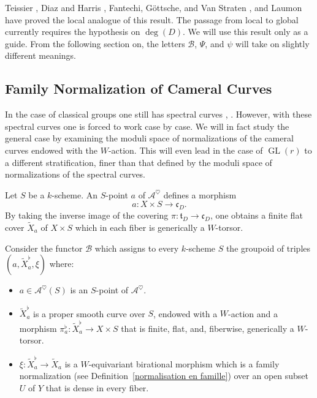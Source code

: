 \documentclass[12pt,english]{smfart}
\numberwithin{equation}{subsection}
\theoremstyle{remark}
\begin{document}

Teissier \cite{T}, Diaz and Harris \cite{DH}, Fantechi, G\"ottsche, and Van Straten \cite{FGV}, and Laumon \cite{L} have proved the local analogue of this result. The passage from local to global currently requires the hypothesis on $\deg(D)$. We will use this result only as a guide. From the following section on, the letters $\mathcal{B}$, $\Psi$, and $\psi$ will take on slightly different meanings.

\subsection{Family Normalization of Cameral Curves}
\label{foncteur B}

In the case of classical groups one still has spectral curves \cite{H}, \cite{compagnon}. However, with these spectral curves one is forced to work case by case. We will in fact study the general case by examining the moduli space of normalizations of the cameral curves endowed with the $W$-action. This will even lead in the case of $\operatorname{GL}(r)$ to a different stratification, finer than that defined by the moduli space of normalizations of the spectral curves.

Let $S$ be a $k$-scheme. An $S$-point $a$ of $\mathcal{A}^\heartsuit$ defines a morphism
$$a:X\times S\rightarrow \mathfrak{c}_D.$$ 
By taking the inverse image of the covering $\pi:\mathfrak{t}_D\rightarrow \mathfrak{c}_D$, one obtains a finite flat cover $\widetilde X_a$ of $X\times S$ which in each fiber is generically a $W$-torsor.

Consider the functor $\mathcal{B}$ which assigns to every $k$-scheme $S$ the groupoid of triples $(a,\widetilde X_a^\flat,\xi)$ where:
\begin{itemize}
  \item $a\in \mathcal{A}^\heartsuit(S)$ is an $S$-point of $\mathcal{A}^\heartsuit$.
  \item $\widetilde X_a^\flat$ is a proper smooth curve over $S$, endowed with a $W$-action and a morphism $\pi_a^\flat:\widetilde X_a^\flat\rightarrow X\times S$ that is finite, flat, and, fiberwise, generically a $W$-torsor.
  \item $\xi:\widetilde X_a^\flat\rightarrow \widetilde X_a$ is a $W$-equivariant birational morphism which is a family normalization (see Definition~\ref{normalisation en famille}) over an open subset $U$ of $Y$ that is dense in every fiber.
\end{itemize}
\end{document}
